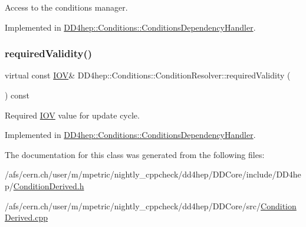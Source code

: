 Access to the conditions manager. 



Implemented in \hyperlink{class_d_d4hep_1_1_conditions_1_1_conditions_dependency_handler_ac0fbf5eeea65550355bf386416f7a3b6}{D\+D4hep\+::\+Conditions\+::\+Conditions\+Dependency\+Handler}.

\hypertarget{class_d_d4hep_1_1_conditions_1_1_condition_resolver_a96b82698fa08d7b1ecb46cd36f5e543f}{}\label{class_d_d4hep_1_1_conditions_1_1_condition_resolver_a96b82698fa08d7b1ecb46cd36f5e543f} 
\subsubsection{\texorpdfstring{required\+Validity()}{requiredValidity()}}
{\footnotesize\ttfamily virtual const \hyperlink{class_d_d4hep_1_1_i_o_v}{I\+OV}\& D\+D4hep\+::\+Conditions\+::\+Condition\+Resolver\+::required\+Validity (\begin{DoxyParamCaption}{ }\end{DoxyParamCaption}) const\hspace{0.3cm}{\ttfamily [pure virtual]}}



Required \hyperlink{class_d_d4hep_1_1_i_o_v}{I\+OV} value for update cycle. 



Implemented in \hyperlink{class_d_d4hep_1_1_conditions_1_1_conditions_dependency_handler_a65870f83dc56b87f3f2056b37ed85e2f}{D\+D4hep\+::\+Conditions\+::\+Conditions\+Dependency\+Handler}.



The documentation for this class was generated from the following files\+:\begin{DoxyCompactItemize}
\item 
/afs/cern.\+ch/user/m/mpetric/nightly\+\_\+cppcheck/dd4hep/\+D\+D\+Core/include/\+D\+D4hep/\hyperlink{_condition_derived_8h}{Condition\+Derived.\+h}\item 
/afs/cern.\+ch/user/m/mpetric/nightly\+\_\+cppcheck/dd4hep/\+D\+D\+Core/src/\hyperlink{_condition_derived_8cpp}{Condition\+Derived.\+cpp}\end{DoxyCompactItemize}

